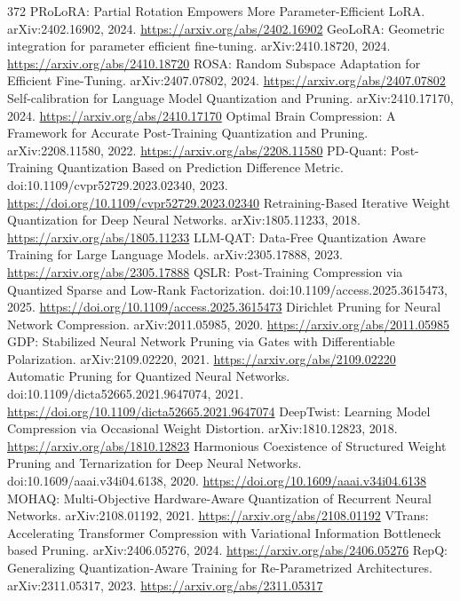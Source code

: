 \documentclass[11pt]{article}
\begin{document}
\begin{thebibliography}{372}
 PRoLoRA: Partial Rotation Empowers More Parameter-Efficient LoRA. arXiv:2402.16902, 2024. \url{https://arxiv.org/abs/2402.16902}
 GeoLoRA: Geometric integration for parameter efficient fine-tuning. arXiv:2410.18720, 2024. \url{https://arxiv.org/abs/2410.18720}
 ROSA: Random Subspace Adaptation for Efficient Fine-Tuning. arXiv:2407.07802, 2024. \url{https://arxiv.org/abs/2407.07802}
 Self-calibration for Language Model Quantization and Pruning. arXiv:2410.17170, 2024. \url{https://arxiv.org/abs/2410.17170}
 Optimal Brain Compression: A Framework for Accurate Post-Training Quantization and Pruning. arXiv:2208.11580, 2022. \url{https://arxiv.org/abs/2208.11580}
 PD-Quant: Post-Training Quantization Based on Prediction Difference Metric. doi:10.1109/cvpr52729.2023.02340, 2023. \url{https://doi.org/10.1109/cvpr52729.2023.02340}
 Retraining-Based Iterative Weight Quantization for Deep Neural Networks. arXiv:1805.11233, 2018. \url{https://arxiv.org/abs/1805.11233}
 LLM-QAT: Data-Free Quantization Aware Training for Large Language Models. arXiv:2305.17888, 2023. \url{https://arxiv.org/abs/2305.17888}
 QSLR: Post-Training Compression via Quantized Sparse and Low-Rank Factorization. doi:10.1109/access.2025.3615473, 2025. \url{https://doi.org/10.1109/access.2025.3615473}
 Dirichlet Pruning for Neural Network Compression. arXiv:2011.05985, 2020. \url{https://arxiv.org/abs/2011.05985}
 GDP: Stabilized Neural Network Pruning via Gates with Differentiable Polarization. arXiv:2109.02220, 2021. \url{https://arxiv.org/abs/2109.02220}
 Automatic Pruning for Quantized Neural Networks. doi:10.1109/dicta52665.2021.9647074, 2021. \url{https://doi.org/10.1109/dicta52665.2021.9647074}
 DeepTwist: Learning Model Compression via Occasional Weight Distortion. arXiv:1810.12823, 2018. \url{https://arxiv.org/abs/1810.12823}
 Harmonious Coexistence of Structured Weight Pruning and Ternarization for Deep Neural Networks. doi:10.1609/aaai.v34i04.6138, 2020. \url{https://doi.org/10.1609/aaai.v34i04.6138}
 MOHAQ: Multi-Objective Hardware-Aware Quantization of Recurrent Neural Networks. arXiv:2108.01192, 2021. \url{https://arxiv.org/abs/2108.01192}
 VTrans: Accelerating Transformer Compression with Variational Information Bottleneck based Pruning. arXiv:2406.05276, 2024. \url{https://arxiv.org/abs/2406.05276}
 RepQ: Generalizing Quantization-Aware Training for Re-Parametrized Architectures. arXiv:2311.05317, 2023. \url{https://arxiv.org/abs/2311.05317}

\end{thebibliography}
\end{document}
